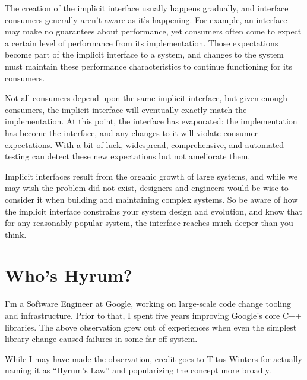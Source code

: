 The creation of the implicit interface usually happens gradually, and interface consumers generally aren’t aware as it’s happening. For example, an interface may make no guarantees about performance, yet consumers often come to expect a certain level of performance from its implementation. Those expectations become part of the implicit interface to a system, and changes to the system must maintain these performance characteristics to continue functioning for its consumers.

Not all consumers depend upon the same implicit interface, but given enough consumers, the implicit interface will eventually exactly match the implementation. At this point, the interface has evaporated: the implementation has become the interface, and any changes to it will violate consumer expectations. With a bit of luck, widespread, comprehensive, and automated testing can detect these new expectations but not ameliorate them.

Implicit interfaces result from the organic growth of large systems, and while we may wish the problem did not exist, designers and engineers would be wise to consider it when building and maintaining complex systems. So be aware of how the implicit interface constrains your system design and evolution, and know that for any reasonably popular system, the interface reaches much deeper than you think.


\section{Who's Hyrum?}
I'm a Software Engineer at Google, working on large-scale code change tooling and infrastructure. Prior to that, I spent five years improving Google's core C++ libraries. The above observation grew out of experiences when even the simplest library change caused failures in some far off system.

While I may have made the observation, credit goes to Titus Winters for actually naming it as \enquote{Hyrum's Law} and popularizing the concept more broadly.